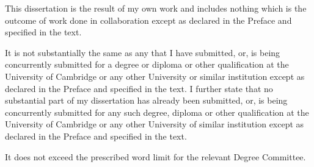 \noindent
This dissertation is the result of my own work and includes nothing which is the
outcome of work done in collaboration except as declared in the Preface and
specified in the text.

It is not substantially the same as any that I have submitted, or, is being
concurrently submitted for a degree or diploma or other qualification at the
University of Cambridge or any other University or similar institution except as
declared in the Preface and specified in the text. I further state that no
substantial part of my dissertation has already been submitted, or, is being
concurrently submitted for any such degree, diploma or other qualification at
the University of Cambridge or any other University of similar institution
except as declared in the Preface and specified in the text.

It does not exceed the prescribed word limit for the relevant Degree Committee.
